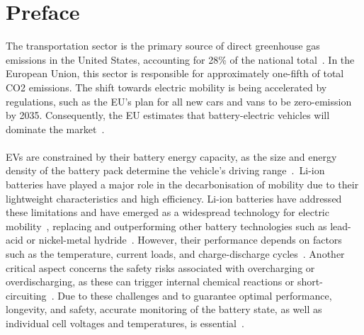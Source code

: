 \chapter*{Preface}\label{sec:Preface}

The transportation sector is the primary source of direct greenhouse gas emissions in the United States, accounting 
for 28\% of the national total~\cite{epa_transportation_2024}. In the European Union, this sector is responsible for
approximately one-fifth of total \ac{CO2} emissions. The shift towards electric mobility is being accelerated by regulations, 
such as the EU's plan for all new cars and vans to be zero-emission by 2035. Consequently, the EU estimates that battery-electric vehicles
will dominate the market~\cite{europarl_2022_cars}.
\\
\\
\acp{EV} are constrained by their battery energy capacity, as the size and energy density of the battery pack 
determine the vehicle's driving range~\cite{plett2015battery}.~\ac{Li-ion} batteries have played a 
major role in the decarbonisation of mobility due to their lightweight characteristics and high efficiency.
\ac{Li-ion} batteries have addressed these limitations and have emerged as a widespread technology for 
electric mobility~\cite{IPCC2022_Mitigation}, replacing and outperforming other battery technologies such as lead-acid 
or nickel-metal hydride~\cite{ma16176063}. However, their performance
depends on factors such as the temperature, current loads, and charge-discharge cycles~\cite{Bosello2025}. 
Another critical aspect concerns the safety risks associated 
with overcharging or overdischarging, as these can trigger 
internal chemical reactions 
or short-circuiting~\cite{plett2015battery}. Due to these challenges and to guarantee optimal performance, longevity, and safety, 
accurate monitoring of the battery state, as well as individual cell voltages and temperatures, is essential~\cite{Bosello2025}.
\\
\\
